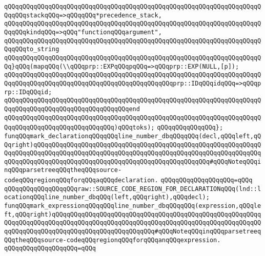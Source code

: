 \verb|qQQqqQQqqQQqqQQqqQQqqQQqqQQqqQQqqQQqqQQqqQQqqQQqqQQqqQQqqQQqqQQqqQQqqQQqqQQqstackqQQq=>qQQqqQQq*precedence_stack,|\newline
\verb|qQQqqQQqqQQqqQQqqQQqqQQqqQQqqQQqqQQqqQQqqQQqqQQqqQQqqQQqqQQqqQQqqQQqqQQqqQQqkindqQQq=>qQQq"functionqQQqargument",|\newline
\verb|qQQqqQQqqQQqqQQqqQQqqQQqqQQqqQQqqQQqqQQqqQQqqQQqqQQqqQQqqQQqqQQqqQQqqQQqqQQqto_string|\newline
\verb|qQQqqQQqqQQqqQQqqQQqqQQqqQQqqQQqqQQqqQQqqQQqqQQqqQQqqQQqqQQqqQQqqQQqqQQq}qQQq(mapqQQq(\\qQQqprp::EXPqQQqpqQQq=>qQQqprp::EXP(NULL,[p]);|\newline
\verb|qQQqqQQqqQQqqQQqqQQqqQQqqQQqqQQqqQQqqQQqqQQqqQQqqQQqqQQqqQQqqQQqqQQqqQQqqQQqqQQqqQQqqQQqqQQqqQQqqQQqqQQqqQQqqQQqqQQqprp::IDqQQqidqQQq=>qQQqprp::IDqQQqid;|\newline
\verb|qQQqqQQqqQQqqQQqqQQqqQQqqQQqqQQqqQQqqQQqqQQqqQQqqQQqqQQqqQQqqQQqqQQqqQQqqQQqqQQqqQQqqQQqqQQqqQQqqQQqqQQqend|\newline
\verb|qQQqqQQqqQQqqQQqqQQqqQQqqQQqqQQqqQQqqQQqqQQqqQQqqQQqqQQqqQQqqQQqqQQqqQQqqQQqqQQqqQQqqQQqqQQqqQQqqQQq)qQQqtoks);|\newline
\verb|qQQqqQQqqQQqqQQq};|\newline
\newline
\newline
\verb|funqQQqmark_declarationqQQqqQQqline_number_dbqQQqqQQq(decl,qQQqleft,qQQqright)qQQqqQQqqQQqqQQqqQQqqQQqqQQqqQQqqQQqqQQqqQQqqQQqqQQqqQQqqQQqqQQqqQQqqQQqqQQqqQQqqQQqqQQqqQQqqQQqqQQqqQQqqQQqqQQqqQQqqQQqqQQqqQQqqQQqqQQqqQQqqQQqqQQqqQQqqQQqqQQqqQQqqQQqqQQqqQQqqQQqqQQqqQQq#qQQqNoteqQQqinqQQqparsetreeqQQqtheqQQqsource-codeqQQqregionqQQqforqQQqaqQQqdeclaration.|\newline
\verb|qQQqqQQqqQQqqQQqqQQq=qQQq|\newline
\verb|qQQqqQQqqQQqqQQqqQQqraw::SOURCE_CODE_REGION_FOR_DECLARATIONqQQq(lnd::locationqQQqline_number_dbqQQq(left,qQQqright),qQQqdecl);|\newline
\newline
\verb|funqQQqmark_expressionqQQqqQQqline_number_dbqQQqqQQq(expression,qQQqleft,qQQqright)qQQqqQQqqQQqqQQqqQQqqQQqqQQqqQQqqQQqqQQqqQQqqQQqqQQqqQQqqQQqqQQqqQQqqQQqqQQqqQQqqQQqqQQqqQQqqQQqqQQqqQQqqQQqqQQqqQQqqQQqqQQqqQQqqQQqqQQqqQQqqQQqqQQqqQQqqQQqqQQqqQQqqQQq#qQQqNoteqQQqinqQQqparsetreeqQQqtheqQQqsource-codeqQQqregionqQQqforqQQqanqQQqexpression.|\newline
\verb|qQQqqQQqqQQqqQQqqQQq=qQQq|\newline

